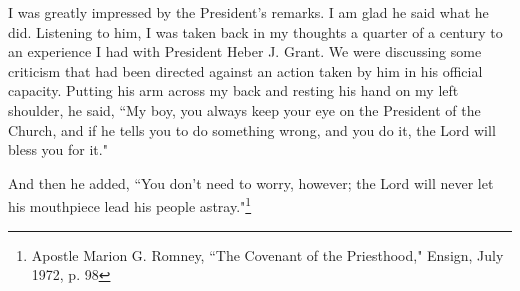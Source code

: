 \begin{displayquote}
I was greatly impressed by the President's remarks. I am glad he said what he did. 
Listening to him, I was taken back in my thoughts a quarter of a century to an 
experience I had with President Heber J. Grant. We were discussing some criticism 
that had been directed against an action taken by him in his official capacity. 
Putting his arm across my back and resting his hand on my left shoulder, he said, 
``My boy, you always keep your eye on the President of the Church, and if he tells 
you to do something wrong, and you do it, the Lord will bless you for it."

And then he added, ``You don't need to worry, however; the Lord will never let his
mouthpiece lead his people astray."\footnote{Apostle Marion G. Romney, 
``The Covenant of the Priesthood," Ensign, July 1972, p. 98}
\end{displayquote}